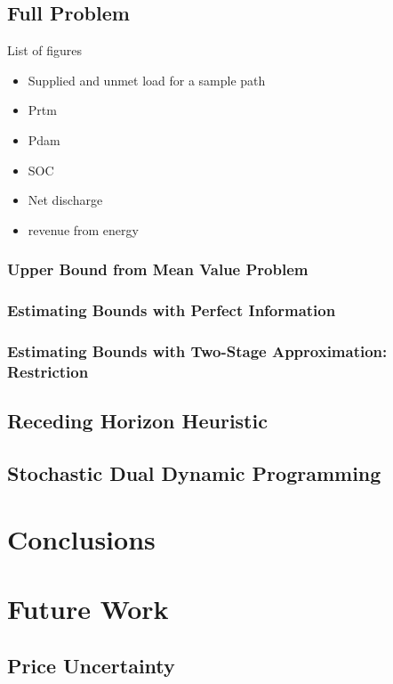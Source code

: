 \documentclass[11pt,twoside]{article}
\begin{document}
\subsection{Full Problem}
List of figures
\begin{itemize}
\item Supplied and unmet load for a sample path
\item Prtm
\item Pdam
\item SOC 
\item Net discharge
\item revenue from energy
\end{itemize}
\subsubsection{Upper Bound from Mean Value Problem}
\subsubsection{Estimating Bounds with Perfect Information}
\subsubsection{Estimating Bounds with Two-Stage Approximation: Restriction}
\subsection{Receding Horizon Heuristic}
\subsection{Stochastic Dual Dynamic Programming}
\section{Conclusions}
\section{Future Work}
\subsection{Price Uncertainty}
\end{document}
